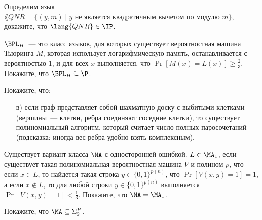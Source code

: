 \begin{ptask}{45}
    Определим язык $\lang{QNR} = \{(y, m) \mid \text{$y$ не является квадратичным вычетом по модулю $m$}\}$, докажите, что
    $\lang{QNR} \in \IP$.
\end{ptask}

\begin{ptask}{46}
    $\BPL_H$~--- это класс языков, для которых существует вероятностная машина Тьюринга $M$, которая использует логарифмическую
    память, останавливается с вероятностью $1$, и для всех $x$ выполняется, что $\Pr[M(x) = L(x)] \ge \frac{2}{3}$. Покажите, что
    $\BPL_H \subseteq \P$.
\end{ptask}

\begin{ptask}{49}
    Покажите, что:
    \begin{enumerate}[topsep = 0pt, itemsep = -1ex]
        \item [в)] если граф представляет собой шахматную доску с выбитыми клетками
            (вершины~--- клетки, ребра соединяют соседние клетки), то существует
            полиномиальный алгоритм, который считает число полных паросочетаний
            (подсказка: иногда вес ребра удобно взять комплексным).
    \end{enumerate}    
\end{ptask}


\begin{ptask}{51}
    Существует вариант класса $\MA$ с односторонней ошибкой. $L \in \MA_1$, если существует такая полиномиальная вероятностная
    машина $V$ и полином $p$, что если $x \in L$, то найдется такая строка $y \in \{0, 1\}^{p(n)}$, что $\Pr[V(x, y) = 1] = 1$, а
    если $x \notin L$, то для любой строки $y \in \{0, 1\}^{p(n)}$ выполняется $\Pr[V(x, y) = 1] < \frac{1}{3}$. Покажите, что
    $\MA = \MA_1$.
\end{ptask}

\begin{ptask}{52}
    Покажите, что $\MA \subseteq \Sigma_2^P$.
\end{ptask}
